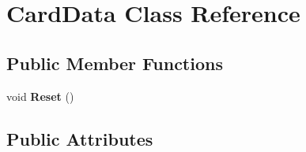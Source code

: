 \hypertarget{classCardData}{
\section{CardData Class Reference}
\label{classCardData}
}
\subsection*{Public Member Functions}
\begin{DoxyCompactItemize}
\item 
\hypertarget{classCardData_a77c665bfd5e8b1f17d6b668e888cf9bd}{
void {\bfseries Reset} ()}
\label{classCardData_a77c665bfd5e8b1f17d6b668e888cf9bd}

\end{DoxyCompactItemize}
\subsection*{Public Attributes}
